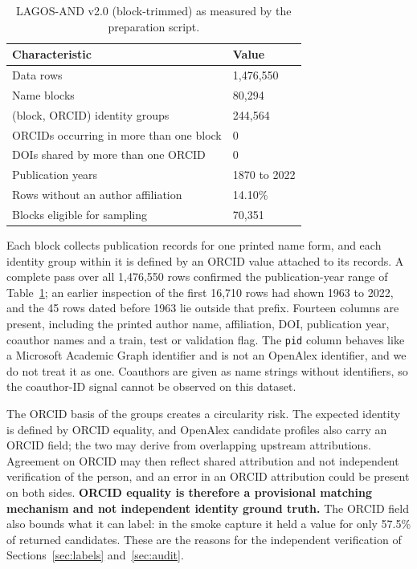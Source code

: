 \begin{table}[t]
\caption{LAGOS-AND v2.0 (block-trimmed) as measured by the preparation script.}
\label{tab:dataset}
\centering
\footnotesize
\renewcommand{\arraystretch}{1.1}
\begin{tabular}{@{}p{}p{}@{}}
\toprule
\textbf{Characteristic} & \textbf{Value} \\
\midrule
Data rows & 1,476,550 \\
Name blocks & 80,294 \\
(block, ORCID) identity groups & 244,564 \\
ORCIDs occurring in more than one block & 0 \\
DOIs shared by more than one ORCID & 0 \\
Publication years & 1870 to 2022 \\
Rows without an author affiliation & 14.10\% \\
Blocks eligible for sampling & 70,351 \\
\bottomrule
\end{tabular}
\end{table}

Each block collects publication records for one printed name form, and each identity group within it is defined by an ORCID value attached to its records. A complete pass over all 1,476,550 rows confirmed the publication-year range of Table~\ref{tab:dataset}; an earlier inspection of the first 16,710 rows had shown 1963 to 2022, and the 45 rows dated before 1963 lie outside that prefix. Fourteen columns are present, including the printed author name, affiliation, DOI, publication year, coauthor names and a train, test or validation flag. The \texttt{pid} column behaves like a Microsoft Academic Graph identifier and is not an OpenAlex identifier, and we do not treat it as one. Coauthors are given as name strings without identifiers, so the coauthor-ID signal cannot be observed on this dataset.

The ORCID basis of the groups creates a circularity risk. The expected identity is defined by ORCID equality, and OpenAlex candidate profiles also carry an ORCID field; the two may derive from overlapping upstream attributions. Agreement on ORCID may then reflect shared attribution and not independent verification of the person, and an error in an ORCID attribution could be present on both sides. \textbf{ORCID equality is therefore a provisional matching mechanism and not independent identity ground truth.} The ORCID field also bounds what it can label: in the smoke capture it held a value for only 57.5\% of returned candidates. These are the reasons for the independent verification of Sections~\ref{sec:labels} and~\ref{sec:audit}.

